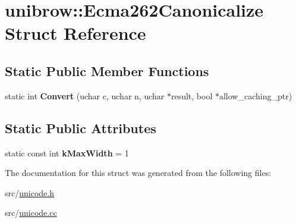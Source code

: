 \hypertarget{structunibrow_1_1_ecma262_canonicalize}{}\section{unibrow\+:\+:Ecma262\+Canonicalize Struct Reference}
\label{structunibrow_1_1_ecma262_canonicalize}
\subsection*{Static Public Member Functions}
\begin{DoxyCompactItemize}
\item 
\hypertarget{structunibrow_1_1_ecma262_canonicalize_accc7f53059012c585aea3345818e1c8b}{}static int {\bfseries Convert} (uchar c, uchar n, uchar $\ast$result, bool $\ast$allow\+\_\+caching\+\_\+ptr)\label{structunibrow_1_1_ecma262_canonicalize_accc7f53059012c585aea3345818e1c8b}

\end{DoxyCompactItemize}
\subsection*{Static Public Attributes}
\begin{DoxyCompactItemize}
\item 
\hypertarget{structunibrow_1_1_ecma262_canonicalize_a5df94ac0193e614eae5cef7ca74c2763}{}static const int {\bfseries k\+Max\+Width} = 1\label{structunibrow_1_1_ecma262_canonicalize_a5df94ac0193e614eae5cef7ca74c2763}

\end{DoxyCompactItemize}


The documentation for this struct was generated from the following files\+:\begin{DoxyCompactItemize}
\item 
src/\hyperlink{unicode_8h}{unicode.\+h}\item 
src/\hyperlink{unicode_8cc}{unicode.\+cc}\end{DoxyCompactItemize}
